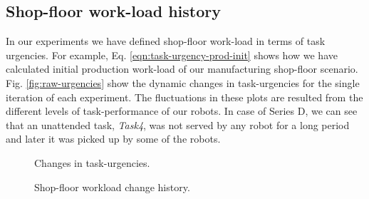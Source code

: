 \documentclass[journal]{IEEEtran}
\begin{document}
\subsection{Shop-floor work-load history}
In our experiments we have defined shop-floor work-load in terms of task urgencies. For example, Eq. \ref{eqn:task-urgency-prod-init} shows how we have calculated initial production work-load of our manufacturing shop-floor scenario. Fig. \ref{fig:raw-urgencies}  show the dynamic changes in task-urgencies for the single iteration of each experiment. The fluctuations in these plots are resulted from the different levels of task-performance of our robots. In case of Series D, we can see that an unattended task, \textit{Task4}, was not served by any robot for a long period and later it was picked up by some of the robots. 
\begin{figure*}
\centering
{}
\newline
{}
\newline
{}
\newline
{}
\newline
\caption{Changes in task-urgencies.}
\label{fig:raw-urgencies}
\centering
{}
\newline
{}
\newline
{}
\newline
{}
\newline
\caption{Shop-floor workload change history.}
\label{fig:urgency-stat}
\end{figure*}
\end{document}
